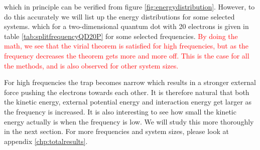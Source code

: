 which in principle can be verified from figure \eqref{fig:energydistribution}. However, 
to do this accurately we will list up the energy distributions for some selected systems.  which for a two-dimensional quantum dot with 20 electrons is given in table \eqref{tab:splitfrequencyQD20P} for some selected frequencies. \textcolor{red}{By doing the math, we see that the virial theorem is satisfied for high frequencies, but as the frequency decreases the theorem gets more and more off. This is the case for all the methods, and is also observed for other system sizes.}

For high frequencies the trap becomes narrow which results in a stronger external force pushing the electrons towards each other. It is therefore natural that both the kinetic energy, external potential energy and interaction energy get larger as the frequency is increased. It is also interesting to see how small the kinetic energy actually is when the frequency is low. We will study this more thoroughly in the next section. For more frequencies and system sizes, please look at appendix \ref{chp:totalresults}.

